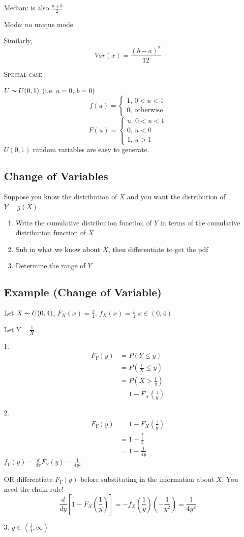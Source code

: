Median: is also $ \frac{a+b}{2} $

Mode: no unique mode

Similarly,
\[ Var(x)=\frac{(b-a)^2}{12} \]

\textsc{Special case}

$ U \thicksim U(0,1) $ (i.e. $ a=0,\,b=0 $)
\[ f(u)=
    \begin{cases}
        1,\,0<u<1 \\
        0,\,\text{otherwise}
    \end{cases} \]
\[ F(u)=
    \begin{cases}
        u,\,0<u<1 \\
        0,\,u<0   \\
        1,\,u>1
    \end{cases} \]
$ U(0,1) $ random variables are easy to generate.

\subsection{Change of Variables}
Suppose you know the distribution of $ X $ and you want the distribution of
$ Y=g(X) $.
\begin{enumerate}
    \item Write the cumulative distribution function of $ Y $ in terms of the cumulative distribution function of $ X $
    \item Sub in what we know about $ X $, then differentiate to get the pdf
    \item Determine the range of $ Y $
\end{enumerate}
\subsection{Example (Change of Variable)}
Let $ X \thicksim U(0,4) $, $ F_X(x)=\frac{x}{4} $, $ f_X(x)=\frac{1}{4} $
$ x\in(0,4) $

Let $ Y=\frac{1}{X} $

1.
\begin{align*}
    F_Y(y) & =P\left(Y\le y\right)            \\
           & =P\left(\frac{1}{X} \le y\right) \\
           & =P\left(X>\frac{1}{y}\right)     \\
           & =1-F_X\left(\frac{1}{y}\right)
\end{align*}

2.
\begin{align*}
    F_Y(y) & =1-F_X\left(\frac{1}{y}\right) \\
           & =1-\frac{\frac{1}{y}}{4}       \\
           & =1-\frac{1}{4y}
\end{align*}
$ f_Y(y)=\frac{d}{dx}F_Y(y)=\frac{1}{4y^2} $

OR differentiate $ F_Y(y) $ before
substituting in the information about $ X $. You need the chain rule!
\[ \frac{d}{dy}\left[1-F_X\left(\frac{1}{y}\right)\right]=
    -f_X\left(\frac{1}{y}\right)\left(-\frac{1}{y^2}\right)=\frac{1}{4y^2} \]

3. $ y\in(\frac{1}{4},\infty) $
